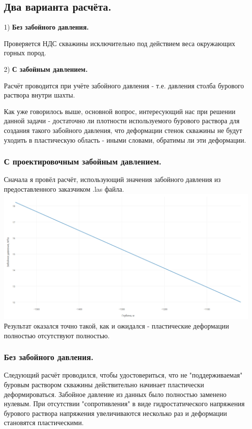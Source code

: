 \documentclass[a4paper,14pt]{scrartcl}
\begin{document}
\newpage
\subsection{Два варианта расчёта.}
\vspace{20px}
\noindent
\begin{minipage}{.5\textwidth}
    1) \textbf{Без забойного давления.}

    Проверяется НДС скважины исключительно под действием веса окружающих горных пород.
\end{minipage}
\hspace{20px}
\begin{minipage}{.5\textwidth}
    2) \textbf{С забойным давлением.}

    Расчёт проводится при учёте забойного давления - т.е. давления столба бурового раствора внутри шахты.
\end{minipage}

\vspace{30px}
Как уже говорилось выше, основной вопрос, интересующий нас при решении данной задачи - достаточно ли плотности используемого бурового раствора для создания такого забойного давления, что деформации стенок скважины не будут уходить в пластическую область - иными словами, обратимы ли эти деформации.
\subsubsection{С проектировочным забойным давлением.}
Сначала я провёл расчёт, использующий значения забойного давления из предоставленного заказчиком .las файла.\newline
\includegraphics[width=1\textwidth]{images/pressure.png}
Результат оказался точно такой, как и ожидался - пластические деформации полностью отсутствуют полностью.\newline
\subsubsection{Без забойного давления.}
Следующий расчёт проводился, чтобы удостовериться, что не "поддерживаемая" буровым раствором скважины действительно начинает пластически деформироваться. Забойное давление из данных было полностью заменено нулевым.\newline
При отсутствии "сопротивления" в виде гидростатического напряжения бурового раствора напряжения увеличиваются несколько раз и деформации становятся пластическими.\newline
\end{document}
